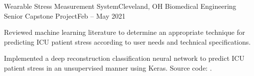 \begin{ritemize}
{Wearable Stress Measurement System}{Cleveland, OH}
{Biomedical Engineering Senior Capstone Project}{Feb -- May 2021}
	\item Reviewed machine learning literature to determine an appropriate technique for predicting ICU patient stress according to user needs and technical specifications.
	\item Implemented a deep reconstruction classification neural network to predict ICU patient stress in an unsupervised manner using Keras. Source code: .
\end{ritemize}